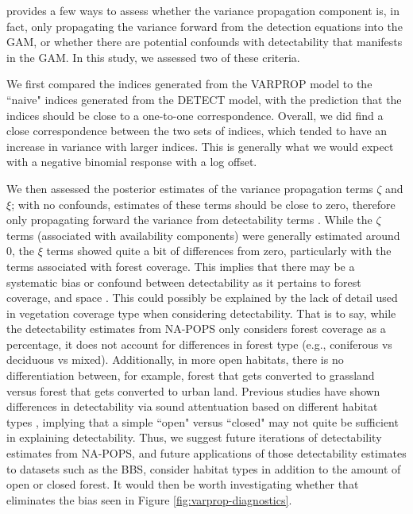 \documentclass[12pt]{article}
\begin{document}
\par \citet{bravington_variance_2021} provides a few ways to assess whether the variance propagation component is, in fact, only propagating the variance forward from the detection equations into the GAM, or whether there are potential confounds with detectability that manifests in the GAM.
In this study, we assessed two of these criteria.

We first compared the indices generated from the VARPROP model to the ``naive" indices generated from the DETECT model, with the prediction that the indices should be close to a one-to-one correspondence.
Overall, we did find a close correspondence between the two sets of indices, which tended to have an increase in variance with larger indices.
This is generally what we would expect with a negative binomial response with a log offset.

We then assessed the posterior estimates of the variance propagation terms $\zeta$ and $\xi$; with no confounds, estimates of these terms should be close to zero, therefore only propagating forward the variance from detectability terms \citep{bravington_variance_2021}.
While the $\zeta$ terms (associated with availability components) were generally estimated around 0, the $\xi$ terms showed quite a bit of differences from zero, particularly with the terms associated with forest coverage.
This implies that there may be a systematic bias or confound between detectability as it pertains to forest coverage, and space \citep{bravington_variance_2021}.
This could possibly be explained by the lack of detail used in vegetation coverage type when considering detectability.
That is to say, while the detectability estimates from NA-POPS only considers forest coverage as a percentage, it does not account for differences in forest type (e.g., coniferous vs deciduous vs mixed).
Additionally, in more open habitats, there is no differentiation between, for example, forest that gets converted to grassland versus forest that gets converted to urban land.
Previous studies have shown differences in detectability via sound attentuation based on different habitat types \citep{schieck_biased_1997}, implying that a simple ``open" versus ``closed" may not quite be sufficient in explaining detectability.
Thus, we suggest future iterations of detectability estimates from NA-POPS, and future applications of those detectability estimates to datasets such as the BBS, consider habitat types in addition to the amount of open or closed forest.
It would then be worth investigating whether that eliminates the bias seen in Figure \ref{fig:varprop-diagnostics}.
\end{document}
